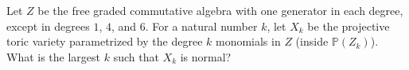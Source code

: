 Let $Z$ be the free graded commutative algebra with one generator in each degree, except in degrees $1$, $4$, and $6$. For a natural number $k$, let $X_k$ be the projective toric variety parametrized by the degree $k$ monomials in $Z$ (inside $\mathbb P(Z_k)$). What is the largest $k$ such that $X_k$ is normal?
